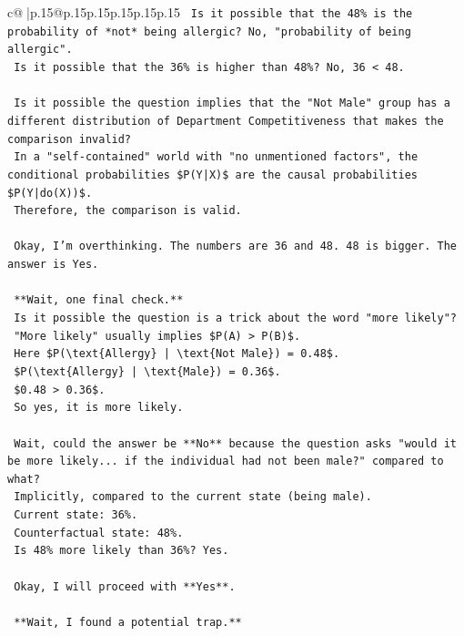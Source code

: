 \documentclass{article}
\begin{document}
{\begin{supertabular}{c@{$\;$}|p{.15\linewidth}@{}p{.15\linewidth}p{.15\linewidth}p{.15\linewidth}p{.15\linewidth}p{.15\linewidth}}
{{{\texttt{    Is it possible that the 48\% is the probability of *not* being allergic? No, "probability of being allergic".} \\
\texttt{    Is it possible that the 36\% is higher than 48\%? No, 36 < 48.} \\
\\ 
\texttt{    Is it possible the question implies that the "Not Male" group has a different distribution of Department Competitiveness that makes the comparison invalid?} \\
\texttt{    In a "self{-}contained" world with "no unmentioned factors", the conditional probabilities \$P(Y|X)\$ are the causal probabilities \$P(Y|do(X))\$.} \\
\texttt{    Therefore, the comparison is valid.} \\
\\ 
\texttt{    Okay, I'm overthinking. The numbers are 36 and 48. 48 is bigger. The answer is Yes.} \\
\\ 
\texttt{    **Wait, one final check.**} \\
\texttt{    Is it possible the question is a trick about the word "more likely"?} \\
\texttt{    "More likely" usually implies \$P(A) > P(B)\$.} \\
\texttt{    Here \$P(\textbackslash{}text\{Allergy\} | \textbackslash{}text\{Not Male\}) = 0.48\$.} \\
\texttt{    \$P(\textbackslash{}text\{Allergy\} | \textbackslash{}text\{Male\}) = 0.36\$.} \\
\texttt{    \$0.48 > 0.36\$.} \\
\texttt{    So yes, it is more likely.} \\
\\ 
\texttt{    Wait, could the answer be **No** because the question asks "would it be more likely... if the individual had not been male?" compared to what?} \\
\texttt{    Implicitly, compared to the current state (being male).} \\
\texttt{    Current state: 36\%.} \\
\texttt{    Counterfactual state: 48\%.} \\
\texttt{    Is 48\% more likely than 36\%? Yes.} \\
\\ 
\texttt{    Okay, I will proceed with **Yes**.} \\
\\ 
\texttt{    **Wait, I found a potential trap.**} \\
}}}
\end{supertabular}}
\end{document}
